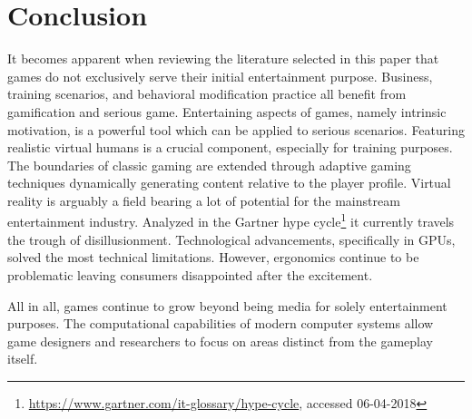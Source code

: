 \section{Conclusion}
It becomes apparent when reviewing the literature selected in this paper that games do not exclusively serve their initial entertainment purpose.
Business, training scenarios, and behavioral modification practice all benefit from gamification and serious game.
Entertaining aspects of games, namely intrinsic motivation, is a powerful tool which can be applied to serious scenarios.
Featuring realistic virtual humans is a crucial component, especially for training purposes.
The boundaries of classic gaming are extended through adaptive gaming techniques dynamically generating content relative to the player profile. 
Virtual reality is arguably a field bearing a lot of potential for the mainstream entertainment industry.
Analyzed in the Gartner hype cycle\footnote{\url{https://www.gartner.com/it-glossary/hype-cycle}, accessed 06-04-2018} it currently travels the trough of disillusionment.
Technological advancements, specifically in GPUs, solved the most technical limitations.
However, ergonomics continue to be problematic leaving consumers disappointed after the excitement.

All in all, games continue to grow beyond being media for solely entertainment purposes.
The computational capabilities of modern computer systems allow game designers and researchers to focus on areas distinct from the gameplay itself.